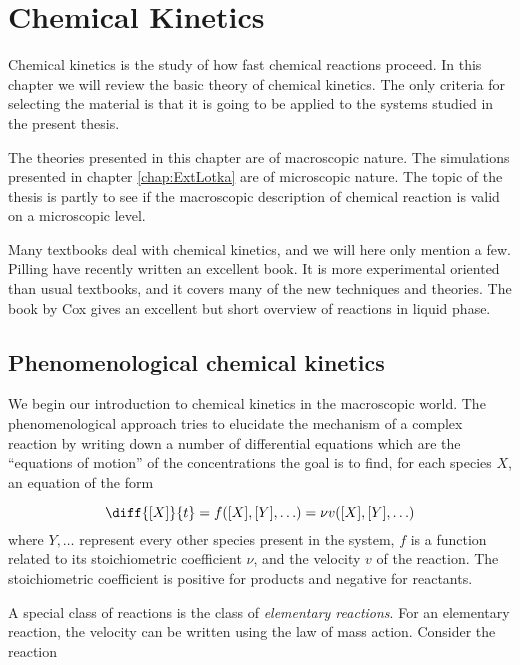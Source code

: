 
\chapter{Chemical Kinetics}
\label{chap:ChemKin}
Chemical kinetics is the study of how fast chemical reactions
proceed. In this chapter we will review the basic theory of chemical
kinetics. The only criteria for selecting the material is that it is
going to be applied to the systems studied in the present thesis.

The theories presented in this chapter are of macroscopic nature. The
simulations presented in chapter \ref{chap:ExtLotka} are of microscopic
nature. The topic of the thesis is partly to see if the macroscopic
description of chemical reaction is valid on a microscopic level.

Many textbooks deal with chemical kinetics, and we will here only
mention a few. Pilling \etal \cite{Pilling95} have recently written
an excellent book. It is more experimental oriented than usual
textbooks, and it covers many of the new techniques and theories. The
book by Cox \cite{Cox} gives an excellent but short overview of
reactions in liquid phase.


\section{Phenomenological chemical kinetics}
\label{sect:PhenoChemKin}
We begin our introduction to chemical kinetics in the macroscopic
world. The phenomenological approach tries to elucidate the mechanism
of a complex reaction by writing down a number of differential
equations which are the ``equations of motion'' of the concentrations
\ie the goal is to find, for each species $X$, an equation of the form

\begin{equation}
  \diff{[X]}{t} = f([X], [Y], \ldots) = \nu v([X], [Y], \ldots)
\end{equation}
where $Y, \ldots$ represent every other species present in the system,
$f$ is a function related to its stoichiometric coefficient $\nu$, and
the velocity $v$ of the reaction. The stoichiometric coefficient is
positive for products and negative for reactants.

A special class of reactions is the class of \textit{elementary
  reactions}. For an elementary reaction, the velocity can be written
using the law of mass action. Consider the reaction

